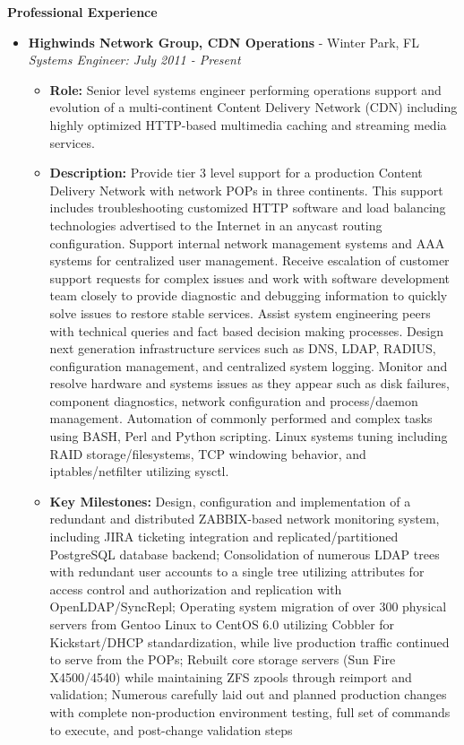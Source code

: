 \documentclass[10pt,oneside]{article}
\newenvironment{ressection}[1]{
	\vspace{4pt}
	\textbf{\selectfont\normalsize#1}
	\begin{itemize}
	\vspace{3pt}
}{
	\end{itemize}
}
\newcommand{\ressubitem}[1]{
	\vspace{-1pt}
	\item \begin{flushleft} #1 \end{flushleft}
}
\newcommand{\resbigitem}[3]{
	\vspace{-5pt}
	\item
	\textbf{#1} - #2 \\
	\textit{#3}
}
\newenvironment{ressubsec}[3]{
	\resbigitem{#1}{#2}{#3}
	\vspace{-2pt}
	\begin{itemize}
}{
	\end{itemize}
}
\begin{document}
\begin{ressection}{Professional Experience}

	\begin{ressubsec}{Highwinds Network Group, CDN Operations}{Winter Park, FL}{Systems Engineer: July 2011 - Present}

		\ressubitem{\textbf{Role:} Senior level systems engineer performing operations support and evolution of a multi-continent Content Delivery Network (CDN) including highly optimized HTTP-based multimedia caching and streaming media services.}
		\ressubitem{\textbf{Description:} Provide tier 3 level support for a production Content Delivery Network with network POPs in three continents.  This support includes troubleshooting customized HTTP software and load balancing technologies advertised to the Internet in an anycast routing configuration.  Support internal network management systems and AAA systems for centralized user management. Receive escalation of customer support requests for complex issues and work with software development team closely to provide diagnostic and debugging information to quickly solve issues to restore stable services.  Assist system engineering peers with technical queries and fact based decision making processes.  Design next generation infrastructure services such as DNS, LDAP, RADIUS, configuration management, and centralized system logging. Monitor and resolve hardware and systems issues as they appear such as disk failures, component diagnostics, network configuration and process/daemon management. Automation of commonly performed and complex tasks using BASH, Perl and Python scripting. Linux systems tuning including RAID storage/filesystems, TCP windowing behavior, and iptables/netfilter utilizing sysctl.}

		\ressubitem{\textbf{Key Milestones:} Design, configuration and implementation of a redundant and distributed ZABBIX-based network monitoring system, including JIRA ticketing integration and replicated/partitioned PostgreSQL database backend; Consolidation of numerous LDAP trees with redundant user accounts to a single tree utilizing attributes for access control and authorization and replication with OpenLDAP/SyncRepl; Operating system migration of over 300 physical servers from Gentoo Linux to CentOS 6.0 utilizing Cobbler for Kickstart/DHCP standardization, while live production traffic continued to serve from the POPs; Rebuilt core storage servers (Sun Fire X4500/4540) while maintaining ZFS zpools through reimport and validation; Numerous carefully laid out and planned production changes with complete non-production environment testing, full set of commands to execute, and post-change validation steps}


\end{ressubsec}
\end{ressection}
\end{document}
